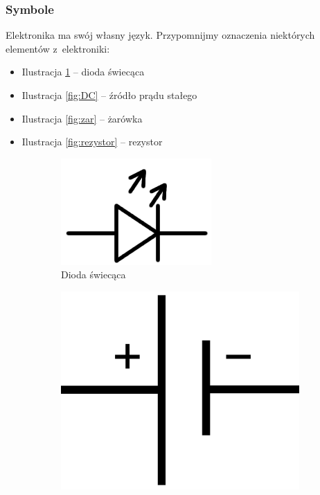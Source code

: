 \documentclass[a4paper,12pt, twoside]{article}
\begin{document}
	\subsubsection {Symbole}
	Elektronika ma swój własny język. Przypomnijmy oznaczenia niektórych elementów z~elektroniki:
\begin{itemize}
	\item Ilustracja \ref{fig:dioda} -- dioda świecąca
	\item Ilustracja \ref{fig:DC} -- źródło prądu stałego
	\item Ilustracja \ref{fig:zar} -- żarówka
	\item Ilustracja \ref{fig:rezystor} -- rezystor
\end{itemize}
\begin{figure}
	\centering
	\begin{subfigure}[h!]{0.25\textwidth}
      \centering
      \includegraphics[scale=0.3]{dioda_swiec.png}
      \caption{Dioda świecąca}
			\label{fig:dioda}
   \end{subfigure}
	\begin{subfigure}[h]{0.25\textwidth}
      \centering
      \includegraphics[scale=0.05]{DC-Source.png}

\end{subfigure}
\end{figure}
\end{document}
